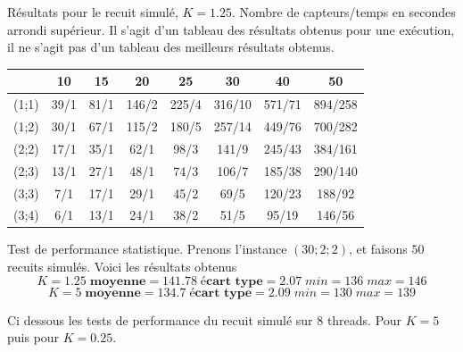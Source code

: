\documentclass[12pt,a4paper]{article}
\begin{document}
Résultats pour le recuit simulé, $K=1.25$. Nombre de capteurs/temps en secondes arrondi supérieur. Il s'agit d'un tableau des résultats obtenus pour une exécution, il ne s'agit pas d'un tableau des meilleurs résultats obtenus.

\begin{center}
\begin{tabular}{|c|c|c|c|c|c|c|c|}
\hline
&10 & 15 & 20 & 25 & 30 & 40 & 50\\
\hline 
(1;1) & 39/1 & 81/1 & 146/2 & 225/4 & 316/10 & 571/71 & 894/258 \\ 
\hline 
(1;2) & 30/1 & 67/1 & 115/2 & 180/5 & 257/14 & 449/76 & 700/282 \\ 
\hline 
(2;2) & 17/1 & 35/1 & 62/1 & 98/3 & 141/9 & 245/43 & 384/161 \\ 
\hline 
(2;3) & 13/1 & 27/1 & 48/1& 74/3 & 106/7 & 185/38 & 290/140 \\ 
\hline 
(3;3) & 7/1 & 17/1 & 29/1 & 45/2 & 69/5 & 120/23 & 188/92 \\ 
\hline 
(3;4) & 6/1 & 13/1 & 24/1 & 38/2 & 51/5 & 95/19 & 146/56 \\ 
\hline 
\end{tabular} 
\end{center}

Test de performance statistique. Prenons l'instance $(30;2;2)$, et faisons $50$ recuits simulés. Voici les résultats obtenus
\[ K=1.25 \; \textbf{moyenne}=141.78 \; \textbf{écart type}=2.07 \; min=136 \; max=146\]
\[ K=5 \; \textbf{moyenne}=134.7 \; \textbf{écart type}=2.09 \; min=130 \; max=139\]

Ci dessous les tests de performance du recuit simulé sur $8$ threads. Pour $K=5$ puis pour $K=0.25$.
\end{document}
